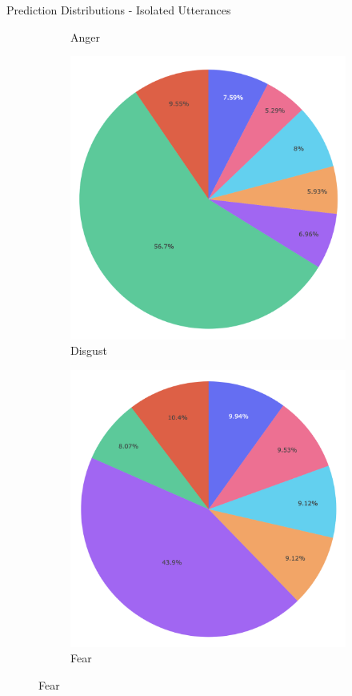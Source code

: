\documentclass[11pt,aspectratio=169]{beamer}
\begin{document}
\begin{frame}{Prediction Distributions - Isolated Utterances}
\begin{figure}[!ht]
\begin{subfigure}{0.18\textwidth}
      \caption*{Anger}
    \end{subfigure}\hfil
    \begin{subfigure}{0.18\textwidth}
      \includegraphics[width=\linewidth]{figures/disgust.png}
      \caption*{Disgust}
    \end{subfigure}\hfil
    \begin{subfigure}{0.18\textwidth}
      \includegraphics[width=\linewidth]{figures/fear.png}
      \caption*{Fear}
    \end{subfigure}
    

\end{figure}
\end{frame}
\end{document}
